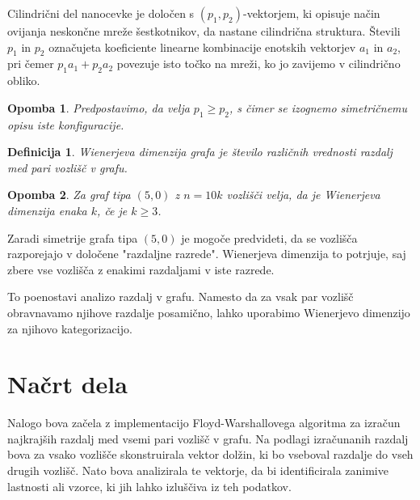 \documentclass[a4paper, 12pt]{article}
\newtheorem{definicija}{Definicija}[section]
\newtheorem{opomba}{Opomba}[section]
\begin{document}
Cilindrični del nanocevke je določen s $(p_1, p_2)$-vektorjem, ki opisuje način ovijanja neskončne mreže šestkotnikov, da nastane cilindrična struktura.  
Števili $p_1$ in $p_2$ označujeta koeficiente linearne kombinacije enotskih vektorjev $a_1$ in $a_2$, pri čemer $p_1a_1 + p_2a_2$ povezuje isto točko na mreži, ko jo zavijemo v cilindrično obliko.

\begin{opomba}
    Predpostavimo, da velja $p_1 \geq p_2$, s čimer se izognemo simetričnemu opisu iste konfiguracije.
\end{opomba}


\begin{definicija} 
    Wienerjeva dimenzija grafa je število različnih vrednosti razdalj med pari vozlišč v grafu. 
\end{definicija} 

\begin{opomba} 
    Za graf tipa $(5,0)$ z $n = 10k$ vozlišči velja, da je Wienerjeva dimenzija enaka $k$, če je $k \geq 3$. 
\end{opomba} 


Zaradi simetrije grafa tipa $(5,0)$ je mogoče predvideti, da se vozlišča razporejajo v določene "razdaljne razrede". 
Wienerjeva dimenzija to potrjuje, saj zbere vse vozlišča z enakimi razdaljami v iste razrede. 

To poenostavi analizo razdalj v grafu. 
Namesto da za vsak par vozlišč obravnavamo njihove razdalje posamično, lahko uporabimo Wienerjevo dimenzijo za njihovo kategorizacijo.

\section{Načrt dela}

Nalogo bova začela z implementacijo Floyd-Warshallovega algoritma za izračun najkrajših razdalj med vsemi pari vozlišč v grafu.
Na podlagi izračunanih razdalj bova za vsako vozlišče skonstruirala vektor dolžin, ki bo vseboval razdalje do vseh drugih vozlišč.
Nato bova analizirala te vektorje, da bi identificirala zanimive lastnosti ali vzorce, ki jih lahko izluščiva iz teh podatkov.
\end{document}
